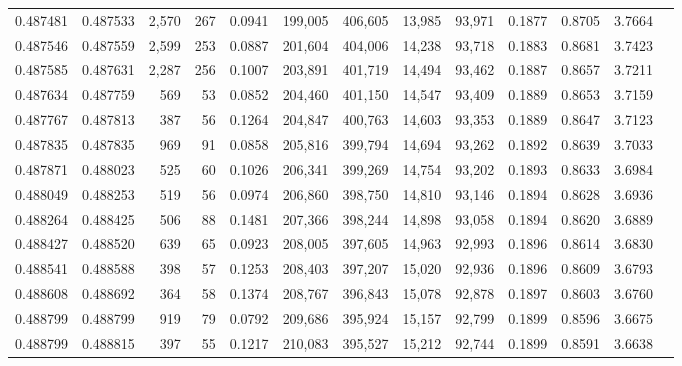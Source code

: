 \begin{tabular}{rrrrrrrrrrrrr}
0.487481 & 0.487533 & 2,570 &   267 &                                     0.0941 & 199,005 & 406,605 &  13,985 &  93,971 & 0.1877 & 0.8705 & 3.7664 \\
0.487546 & 0.487559 & 2,599 &   253 &                                     0.0887 & 201,604 & 404,006 &  14,238 &  93,718 & 0.1883 & 0.8681 & 3.7423 \\
0.487585 & 0.487631 & 2,287 &   256 &                                     0.1007 & 203,891 & 401,719 &  14,494 &  93,462 & 0.1887 & 0.8657 & 3.7211 \\
0.487634 & 0.487759 &   569 &    53 &                                     0.0852 & 204,460 & 401,150 &  14,547 &  93,409 & 0.1889 & 0.8653 & 3.7159 \\
0.487767 & 0.487813 &   387 &    56 &                                     0.1264 & 204,847 & 400,763 &  14,603 &  93,353 & 0.1889 & 0.8647 & 3.7123 \\
0.487835 & 0.487835 &   969 &    91 &                                     0.0858 & 205,816 & 399,794 &  14,694 &  93,262 & 0.1892 & 0.8639 & 3.7033 \\
0.487871 & 0.488023 &   525 &    60 &                                     0.1026 & 206,341 & 399,269 &  14,754 &  93,202 & 0.1893 & 0.8633 & 3.6984 \\
0.488049 & 0.488253 &   519 &    56 &                                     0.0974 & 206,860 & 398,750 &  14,810 &  93,146 & 0.1894 & 0.8628 & 3.6936 \\
0.488264 & 0.488425 &   506 &    88 &                                     0.1481 & 207,366 & 398,244 &  14,898 &  93,058 & 0.1894 & 0.8620 & 3.6889 \\
0.488427 & 0.488520 &   639 &    65 &                                     0.0923 & 208,005 & 397,605 &  14,963 &  92,993 & 0.1896 & 0.8614 & 3.6830 \\
0.488541 & 0.488588 &   398 &    57 &                                     0.1253 & 208,403 & 397,207 &  15,020 &  92,936 & 0.1896 & 0.8609 & 3.6793 \\
0.488608 & 0.488692 &   364 &    58 &                                     0.1374 & 208,767 & 396,843 &  15,078 &  92,878 & 0.1897 & 0.8603 & 3.6760 \\
0.488799 & 0.488799 &   919 &    79 &                                     0.0792 & 209,686 & 395,924 &  15,157 &  92,799 & 0.1899 & 0.8596 & 3.6675 \\
0.488799 & 0.488815 &   397 &    55 &                                     0.1217 & 210,083 & 395,527 &  15,212 &  92,744 & 0.1899 & 0.8591 & 3.6638 \\

\end{tabular}
